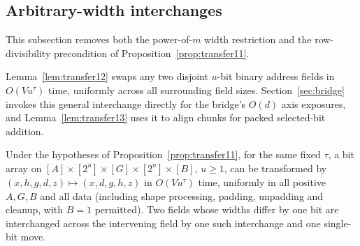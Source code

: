 \subsection{Arbitrary-width interchanges}\label{sec:transfer-arbitrary}

This subsection removes both the power-of-$m$ width restriction and the row-divisibility precondition of Proposition~\ref{prop:transfer11}.

Lemma~\ref{lem:transfer12} swaps any two disjoint $u$-bit binary address fields in $O(V u^\tau)$ time, uniformly across all surrounding field sizes. Section~\ref{sec:bridge} invokes this general interchange directly for the bridge's $O(d)$ axis exposures, and Lemma~\ref{lem:transfer13} uses it to align chunks for packed selected-bit addition.

\begin{lemma}\label{lem:transfer12}
Under the hypotheses of Proposition~\ref{prop:transfer11}, for the same fixed $\tau$, a bit array on
$[A]\times[2^u]\times[G]\times[2^u]\times[B]$, $u\ge1$, can be transformed by $(x,h,g,d,z)\mapsto(x,d,g,h,z)$ in
$O(Vu^\tau)$ time, uniformly in all positive $A,G,B$ and all data (including shape processing, padding, unpadding and
cleanup, with $B=1$ permitted). Two fields whose widths differ by one bit are interchanged across the intervening field
by one such interchange and one single-bit move.
\end{lemma}

